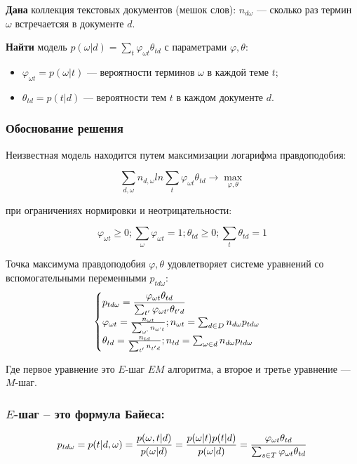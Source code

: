 \documentclass[10pt]{article}
\renewcommand{\geq}{\geqslant}
\renewcommand{\phi}{\varphi}
\begin{document}
\textbf{Дана} коллекция текстовых документов (мешок слов): $n_{d\omega}$ --- сколько раз термин $\omega$ встречаетсяя в документе $d$.

\textbf{Найти} модель $p(\omega | d) = \sum_t \phi_{\omega t}\theta_{td}$ с параметрами $\phi, \theta$:

\begin{itemize}
	\item $\phi_{\omega t} = p(\omega | t)$  --- вероятности терминов $\omega$ в каждой теме $t$;
	\item $\theta_{td} = p(t | d)$ --- вероятности тем $t$ в каждом документе $d$.
\end{itemize}

\subsubsection{Обоснование решения}

Неизвестная модель находится путем максимизации логарифма правдоподобия:

$$ \sum_{d,\omega} n_{d,\omega} ln \sum_{t} \phi_{\omega t}\theta_{td} \rightarrow  \max_{\phi, \theta}$$

при ограничениях нормировки и неотрицательности:

$$ \phi_{\omega t} \geq 0; \sum_{\omega} \phi_{\omega t} = 1; \theta_{td} \geq 0; \sum_{t} \theta_{td} = 1$$

Точка максимума правдоподобия $\phi, \theta$ удовлетворяет системе уравнений со вспомогательными переменными $p_{td\omega}$:
$$
\begin{cases}
\displaystyle
p_{td\omega}={ {\phi_{\omega t} \theta_{td} } \over { \sum_{t'} \phi_{\omega t'} \theta_{t'd}}}\\
\phi_{\omega t} = { {n_{\omega t}} \over {\sum_{\omega `} n_{\omega `t}}}; n_{\omega t} = \sum_{d \in D} n_{d\omega}p_{td\omega}\\
\theta_{td} = { {n_{td}} \over {\sum_{t'}n_{t'd}}}; n_{td} = \sum_{\omega \in d} n_{d\omega}p_{td\omega}
\end{cases}
$$

Где первое уравнение это $E$-шаг $EM$ алгоритма, а второе и третье уравнение --- $M$-шаг.

\subsubsection*{$E$-шаг -- это формула Байеса:}

$$p_{td\omega} = p(t | d, \omega) = { {p(\omega , t | d)} \over {p(\omega | d)}} = { {p(\omega | t) p(t|d)} \over {p(\omega | d)}}= {{\phi_{\omega t}\theta_{td}} \over {\sum_{s \in T}\phi_{\omega t}\theta_{td}}}$$
\end{document}
